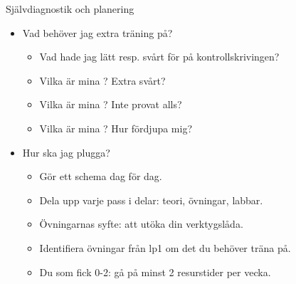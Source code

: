 %
%
%

\begin{Slide}{Självdiagnostik och planering}
\begin{itemize}
  \item Vad behöver jag extra träning på?
  \begin{itemize}
    \item Vad hade jag lätt resp. svårt för på kontrollskrivingen?
    \item Vilka är mina ? Extra svårt?
    \item Vilka är mina ? Inte provat alls?
    \item Vilka är mina ? Hur fördjupa mig?
  \end{itemize}
  \item Hur ska jag plugga?
  \begin{itemize}
    \item Gör ett schema dag för dag.
    \item Dela upp varje pass i delar: teori, övningar, labbar. 
    \item Övningarnas syfte: att utöka din verktygslåda.
    \item Identifiera övningar från lp1 om det du behöver träna på.
    \item Du som fick 0-2: gå på minst 2 resurstider per vecka.
  \end{itemize}
\end{itemize}
\end{Slide}



